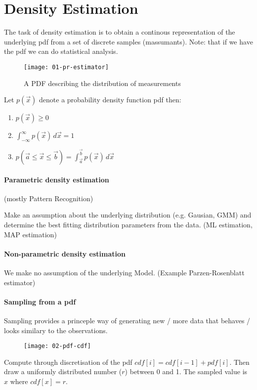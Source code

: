 
\section*{Density Estimation}
The task of density estimation is to obtain a continous representation of the underlying pdf from a set of discrete samples (massumants). Note: that if we have the pdf we can do statistical analysis.

\begin{figure}[H]
  \centering
  \texttt{[image: 01-pr-estimator]}
  \caption{A PDF describing the distribution of measurements}
\end{figure}

Let $p(\vec{x})$ denote a probability density function pdf then:

\begin{enumerate}
  \item $p(\vec{x}) \ge 0$
  \item $\int_{-\infty}^\infty p(\vec{x}) \,d\vec{x} = 1$
  \item $p(\vec{a} \le \vec{x} \le \vec{b}) = \int_{\vec{a}}^{\vec{b}} p(\vec{x}) \,d\vec{x}$
\end{enumerate}

\paragraph{Parametric density estimation}
(mostly Pattern Recognition)

Make an assumption about the underlying distribution (e.g. Gausian, GMM) and determine the best fitting distribution parameters from the data. (ML estimation, MAP estimation)

\paragraph{Non-parametric density estimation}

We make no assumption of the underlying Model. (Example Parzen-Rosenblatt estimator)

\paragraph{Sampling from a pdf}
Sampling provides a princeple way of generating new / more data that behaves / looks similary to the observations.

\begin{figure}[H]
  \centering
  \texttt{[image: 02-pdf-cdf]}
\end{figure}

Compute through discretisation of the pdf $cdf[i] = cdf[i-1] + pdf[i]$. Then draw a uniformly distributed number ($r$) between 0 and 1. The sampled value is $x$ where $cdf[x] = r$.
